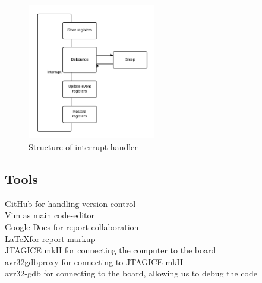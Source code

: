 \begin{figure}[h!]
  \caption{Structure of interrupt handler}
  \centering
    \includegraphics[width=0.5\textwidth]{Interrupt}
\end{figure}
\subsection{Tools}


GitHub for handling version control\\
Vim as main code-editor\\
Google Docs for report collaboration\\
\LaTeX for report markup\\
JTAGICE mkII for connecting the computer to the board\\
avr32gdbproxy for connecting to JTAGICE mkII\\
avr32-gdb for connecting to the board, allowing us to debug the code\\

